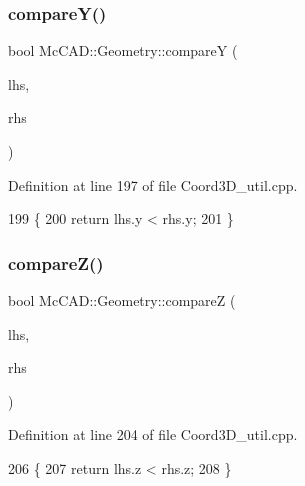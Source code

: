 \subsubsection{\texorpdfstring{compare\+Y()}{compareY()}}
{\footnotesize\ttfamily bool Mc\+C\+A\+D\+::\+Geometry\+::compareY (\begin{DoxyParamCaption}\item[{const \hyperlink{classMcCAD_1_1Geometry_1_1Coord3D}{Coord3D} \&}]{lhs,  }\item[{const \hyperlink{classMcCAD_1_1Geometry_1_1Coord3D}{Coord3D} \&}]{rhs }\end{DoxyParamCaption})}



Definition at line 197 of file Coord3\+D\+\_\+util.\+cpp.


\begin{DoxyCode}
199                            \{
200     \textcolor{keywordflow}{return} lhs.y < rhs.y;
201 \}
\end{DoxyCode}
\mbox{\label{namespaceMcCAD_1_1Geometry_a2e427f654d7794d0f8cce7a0d0d06c41}} 
\subsubsection{\texorpdfstring{compare\+Z()}{compareZ()}}
{\footnotesize\ttfamily bool Mc\+C\+A\+D\+::\+Geometry\+::compareZ (\begin{DoxyParamCaption}\item[{const \hyperlink{classMcCAD_1_1Geometry_1_1Coord3D}{Coord3D} \&}]{lhs,  }\item[{const \hyperlink{classMcCAD_1_1Geometry_1_1Coord3D}{Coord3D} \&}]{rhs }\end{DoxyParamCaption})}



Definition at line 204 of file Coord3\+D\+\_\+util.\+cpp.


\begin{DoxyCode}
206                            \{
207     \textcolor{keywordflow}{return} lhs.z < rhs.z;
208 \}
\end{DoxyCode}
\mbox{\label{namespaceMcCAD_1_1Geometry_a56c190a48b294fd9ff6479afa739ddbd}} 

